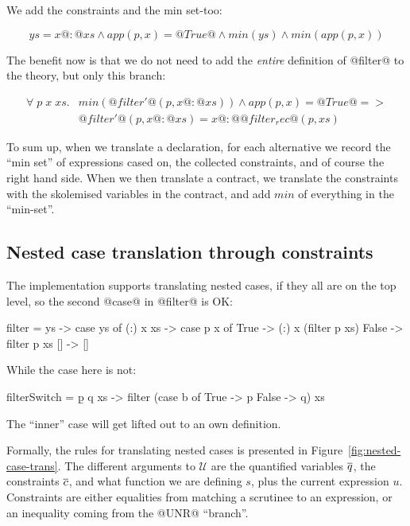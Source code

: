 We add the constraints and the min set-too:

$$ys = x@:@xs \land app(p,x) = @True@ \land min(ys) \land min(app(p,x)) $$

The benefit now is that we do not need to add the \emph{entire}
definition of @filter@ to the theory, but only this branch:

\[\begin{array}{rl}
\forall \; p \; x \; xs . & min(@filter'@(p,x@:@xs)) \land app(p,x) = @True@ => \\
                          & @filter'@(p,x@:@xs) = x @:@ @filter_rec@(p,xs)
\end{array}\]

To sum up, when we translate a declaration, for each alternative we
record the ``min set'' of expressions cased on, the collected
constraints, and of course the right hand side. When we then translate
a contract, we translate the constraints with the skolemised variables
in the contract, and add $min$ of everything in the ``min-set''.

\subsection{Nested case translation through constraints}

The implementation supports translating nested cases, if they all are
on the top level, so the second @case@ in @filter@ is OK:

\begin{code}
    filter = \p ys -> case ys of
        (:) x xs -> case p x of
            True -> (:) x (filter p xs)
            False -> filter p xs
        [] -> []
\end{code}

While the case here is not:
\begin{code}
    filterSwitch = \b p q xs ->
                 filter (case b of
                             True -> p
                             False -> q) xs
\end{code}

The ``inner'' case will get lifted out to an own definition.

Formally, the rules for translating nested cases is presented in
Figure~\ref{fig:nested-case-trans}. The different arguments to
$\mathcal{U}$ are the quantified variables $\overline{q}$, the constraints
$\overline{c}$, and what function we are defining $s$, plus the current
expression $u$.  Constraints are either equalities from matching a
scrutinee to an expression, or an inequality coming from the @UNR@
``branch''.

